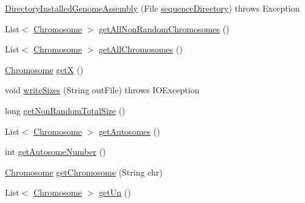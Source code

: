 \begin{DoxyCompactItemize}
\item 
\hyperlink{classbroad_1_1pda_1_1feature_1_1genome_1_1_directory_installed_genome_assembly_aaf444f5ce1bbcf679afbc9fde1fb7cb8}{Directory\+Installed\+Genome\+Assembly} (File \hyperlink{classbroad_1_1pda_1_1feature_1_1genome_1_1_directory_installed_genome_assembly_a529d514f5acc335c587e3a0d86f13762}{sequence\+Directory})  throws Exception 
\item 
List$<$ \hyperlink{classbroad_1_1pda_1_1feature_1_1genome_1_1_chromosome}{Chromosome} $>$ \hyperlink{classbroad_1_1pda_1_1feature_1_1genome_1_1_directory_installed_genome_assembly_a40ce13a9c4f63ea6766e1b7a4762693c}{get\+All\+Non\+Random\+Chromosomes} ()
\item 
List$<$ \hyperlink{classbroad_1_1pda_1_1feature_1_1genome_1_1_chromosome}{Chromosome} $>$ \hyperlink{classbroad_1_1pda_1_1feature_1_1genome_1_1_directory_installed_genome_assembly_add74b3876e83af8631034564c062779f}{get\+All\+Chromosomes} ()
\item 
\hyperlink{classbroad_1_1pda_1_1feature_1_1genome_1_1_chromosome}{Chromosome} \hyperlink{classbroad_1_1pda_1_1feature_1_1genome_1_1_directory_installed_genome_assembly_a3d2f23d85c86e9f373043c9bcd17422c}{get\+X} ()
\item 
void \hyperlink{classbroad_1_1pda_1_1feature_1_1genome_1_1_directory_installed_genome_assembly_a94491da1eb744a1f3b2693b7b4d1d39a}{write\+Sizes} (String out\+File)  throws I\+O\+Exception 
\item 
long \hyperlink{classbroad_1_1pda_1_1feature_1_1genome_1_1_directory_installed_genome_assembly_aff762dacbc8fb6031f31388771d745cb}{get\+Non\+Random\+Total\+Size} ()
\item 
List$<$ \hyperlink{classbroad_1_1pda_1_1feature_1_1genome_1_1_chromosome}{Chromosome} $>$ \hyperlink{classbroad_1_1pda_1_1feature_1_1genome_1_1_directory_installed_genome_assembly_af979446fb4d640dfbf1e24750523a3bb}{get\+Autosomes} ()
\item 
int \hyperlink{classbroad_1_1pda_1_1feature_1_1genome_1_1_directory_installed_genome_assembly_a8e47c044e18a1d686806e8553965287c}{get\+Autosome\+Number} ()
\item 
\hyperlink{classbroad_1_1pda_1_1feature_1_1genome_1_1_chromosome}{Chromosome} \hyperlink{classbroad_1_1pda_1_1feature_1_1genome_1_1_directory_installed_genome_assembly_a51ba62097bffbb4e5fe307283bf12610}{get\+Chromosome} (String chr)
\item 
List$<$ \hyperlink{classbroad_1_1pda_1_1feature_1_1genome_1_1_chromosome}{Chromosome} $>$ \hyperlink{classbroad_1_1pda_1_1feature_1_1genome_1_1_directory_installed_genome_assembly_a604c602d0427720cdf86a6fd7a885743}{get\+Un} ()

\end{DoxyCompactItemize}
